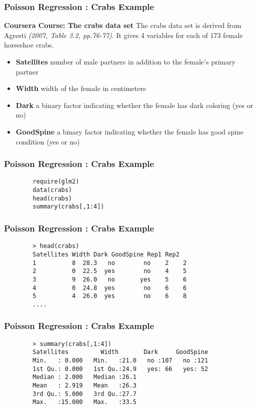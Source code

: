 \documentclass[MASTER.tex]{subfiles}
\begin{document}
\begin{frame}[fragile]
	\frametitle{Poisson Regression :  Crabs Example}
	\textbf{Coursera Course: The crabs data set}
	The crabs data set is derived from Agresti \textit{(2007, Table 3.2, pp.76-77)}. It gives 4 variables for each of 173 female horseshoe crabs.
	\begin{itemize}
		\item \textbf{Satellites}
		number of male partners in addition to the female's primary partner
		
		\item \textbf{Width}
		width of the female in centimeters
		
		\item \textbf{Dark}
		a binary factor indicating whether the female has dark coloring (yes or no)
		
		\item \textbf{GoodSpine}
		a binary factor indicating whether the female has good spine condition (yes or no)
	\end{itemize}
\end{frame}
\begin{frame}[fragile]
	\frametitle{Poisson Regression :  Crabs Example}
	\begin{framed}
		\begin{verbatim}
		require(glm2)
		data(crabs)
		head(crabs)
		summary(crabs[,1:4])
		\end{verbatim}
		\end{framed}
	\end{frame}
	\begin{frame}[fragile]
		\frametitle{Poisson Regression :  Crabs Example}
		\begin{verbatim}
		> head(crabs)
		Satellites Width Dark GoodSpine Rep1 Rep2
		1          8  28.3   no        no    2    2
		2          0  22.5  yes        no    4    5
		3          9  26.0   no       yes    5    6
		4          0  24.8  yes        no    6    6
		5          4  26.0  yes        no    6    8
		....
		\end{verbatim}
	\end{frame}
	\begin{frame}[fragile]
		\frametitle{Poisson Regression :  Crabs Example}
		\begin{verbatim}
		> summary(crabs[,1:4])
		Satellites         Width       Dark     GoodSpine
		Min.   : 0.000   Min.   :21.0   no :107   no :121  
		1st Qu.: 0.000   1st Qu.:24.9   yes: 66   yes: 52  
		Median : 2.000   Median :26.1                      
		Mean   : 2.919   Mean   :26.3                      
		3rd Qu.: 5.000   3rd Qu.:27.7                      
		Max.   :15.000   Max.   :33.5                
		
		\end{verbatim}
	\end{frame}
\end{document}
